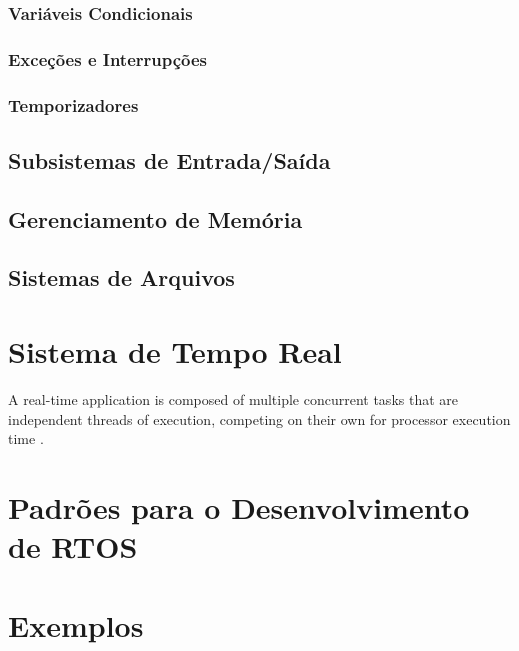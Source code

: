 \subsubsection{Variáveis Condicionais}

\subsubsection{Exceções e Interrupções}

\subsubsection{Temporizadores}

\subsection{Subsistemas de Entrada/Saída}

\subsection{Gerenciamento de Memória}

\subsection{Sistemas de Arquivos}


\section{Sistema de Tempo Real}

A real-time application is composed of multiple concurrent tasks that are independent threads of execution, competing on their own for processor execution time \cite{qingli}.

\section{Padrões para o Desenvolvimento de RTOS}

\section{Exemplos}
